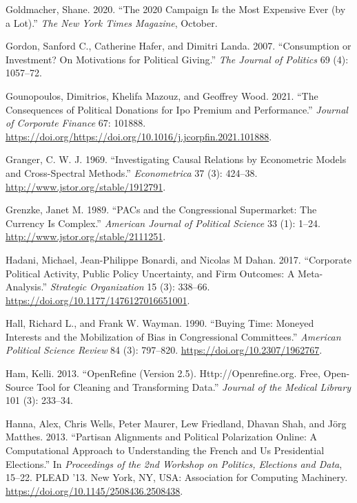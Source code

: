\documentclass[12pt,]{article}
\begin{document}
\leavevmode\hypertarget{ref-goldmacher2020}{}%
Goldmacher, Shane. 2020. ``The 2020 Campaign Is the Most Expensive Ever
(by a Lot).'' \emph{The New York Times Magazine}, October.

\leavevmode\hypertarget{ref-gordon2007}{}%
Gordon, Sanford C., Catherine Hafer, and Dimitri Landa. 2007.
``Consumption or Investment? On Motivations for Political Giving.''
\emph{The Journal of Politics} 69 (4): 1057--72.

\leavevmode\hypertarget{ref-gounopoulos2021}{}%
Gounopoulos, Dimitrios, Khelifa Mazouz, and Geoffrey Wood. 2021. ``The
Consequences of Political Donations for Ipo Premium and Performance.''
\emph{Journal of Corporate Finance} 67: 101888.
\url{https://doi.org/https://doi.org/10.1016/j.jcorpfin.2021.101888}.

\leavevmode\hypertarget{ref-granger}{}%
Granger, C. W. J. 1969. ``Investigating Causal Relations by Econometric
Models and Cross-Spectral Methods.'' \emph{Econometrica} 37 (3):
424--38. \url{http://www.jstor.org/stable/1912791}.

\leavevmode\hypertarget{ref-grenzke1989}{}%
Grenzke, Janet M. 1989. ``PACs and the Congressional Supermarket: The
Currency Is Complex.'' \emph{American Journal of Political Science} 33
(1): 1--24. \url{http://www.jstor.org/stable/2111251}.

\leavevmode\hypertarget{ref-hadani2017}{}%
Hadani, Michael, Jean-Philippe Bonardi, and Nicolas M Dahan. 2017.
``Corporate Political Activity, Public Policy Uncertainty, and Firm
Outcomes: A Meta-Analysis.'' \emph{Strategic Organization} 15 (3):
338--66. \url{https://doi.org/10.1177/1476127016651001}.

\leavevmode\hypertarget{ref-hall1990}{}%
Hall, Richard L., and Frank W. Wayman. 1990. ``Buying Time: Moneyed
Interests and the Mobilization of Bias in Congressional Committees.''
\emph{American Political Science Review} 84 (3): 797--820.
\url{https://doi.org/10.2307/1962767}.

\leavevmode\hypertarget{ref-openrefine}{}%
Ham, Kelli. 2013. ``OpenRefine (Version 2.5). Http://Openrefine.org.
Free, Open-Source Tool for Cleaning and Transforming Data.''
\emph{Journal of the Medical Library} 101 (3): 233--34.

\leavevmode\hypertarget{ref-hanna2013}{}%
Hanna, Alex, Chris Wells, Peter Maurer, Lew Friedland, Dhavan Shah, and
Jörg Matthes. 2013. ``Partisan Alignments and Political Polarization
Online: A Computational Approach to Understanding the French and Us
Presidential Elections.'' In \emph{Proceedings of the 2nd Workshop on
Politics, Elections and Data}, 15--22. PLEAD '13. New York, NY, USA:
Association for Computing Machinery.
\url{https://doi.org/10.1145/2508436.2508438}.
\end{document}
